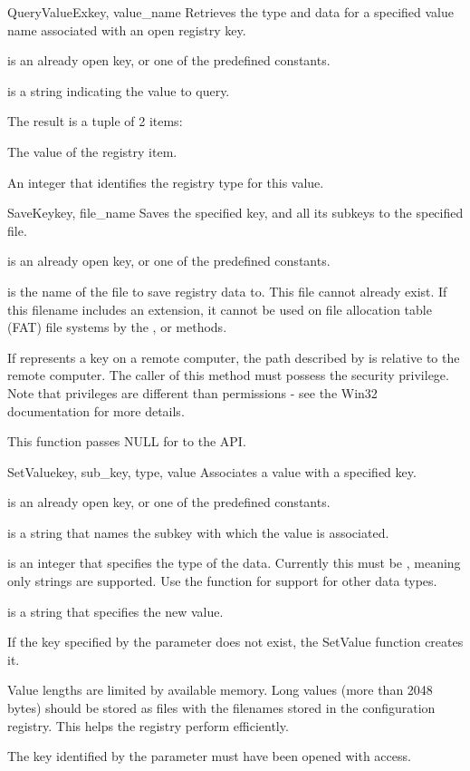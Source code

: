 \begin{funcdesc}{QueryValueEx}{key, value_name}
  Retrieves the type and data for a specified value name associated with 
  an open registry key.
  
  is an already open key, or one of the predefined 
  constants.

  is a string indicating the value to query.

 The result is a tuple of 2 items:
 \item [value]
 The value of the registry item.
 \item [type_id]
 An integer that identifies the registry type for this value.
\end{funcdesc}


\begin{funcdesc}{SaveKey}{key, file_name}
  Saves the specified key, and all its subkeys to the specified file.

  is an already open key, or one of the predefined 
  constants.

  is the name of the file to save registry data to.
  This file cannot already exist. If this filename includes an extension,
  it cannot be used on file allocation table (FAT) file systems by the
  ,  or 
   methods.

 If  represents a key on a remote computer, the path 
 described by  is relative to the remote computer.
 The caller of this method must possess the  
 security privilege.  Note that privileges are different than permissions 
 - see the Win32 documentation for more details.
 
 This function passes NULL for  to the API.
\end{funcdesc}


\begin{funcdesc}{SetValue}{key, sub_key, type, value}
 Associates a value with a specified key.
 
  is an already open key, or one of the predefined 
  constants.

  is a string that names the subkey with which the value 
 is associated.
 
  is an integer that specifies the type of the data.  Currently this
 must be , meaning only strings are supported.
 Use the  function for support for other data types.
 
  is a string that specifies the new value.

 If the key specified by the  parameter does not exist, 
 the SetValue function creates it.

 Value lengths are limited by available memory. Long values (more than
 2048 bytes) should be stored as files with the filenames stored in 
 the configuration registry.  This helps the registry perform efficiently.

 The key identified by the  parameter must have been 
 opened with  access.
\end{funcdesc}


